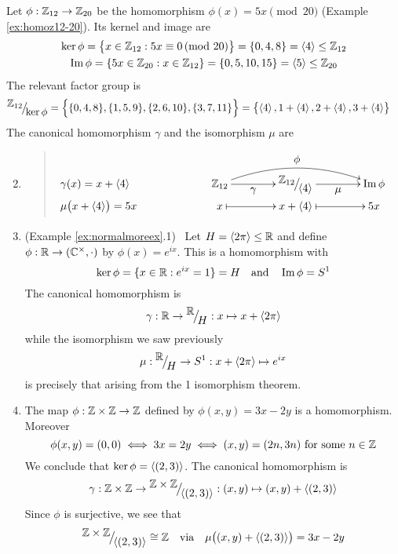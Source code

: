 \begin{examples}{}{}
\exstart Let $\phi:\mathbb{Z}_{12}\to\mathbb{Z}_{20}$ be the homomorphism $\phi(x)=5x\!\!\pmod{20}$ (Example \ref{ex:homoz12-20}). Its kernel and image are
	\begin{gather*}
	\ker\phi=\bigl\{x\in\mathbb{Z}_{12}:5x\equiv 0\negthickspace\pmod{20}\bigr\}=\{0,4,8\}=\left\langle 4\right\rangle\le \mathbb{Z}_{12}\\
	\operatorname{Im}\phi=\{5x\in\mathbb{Z}_{20}:x\in\mathbb{Z}_{12}\}=\{0,5,10,15\}=\left\langle 5\right\rangle\le\mathbb{Z}_{20}
	\end{gather*}
	The relevant factor group is
	\begin{align*}
	{}^{\textstyle {\mathbb{Z}_{12}}}\!\big/_{\textstyle \!{\ker\phi}}&=\Bigl\{\{0,4,8\},\{1,5,9\},\{2,6,10\},\{3,7,11\}\Bigr\}  =\bigl\{\left\langle 4\right\rangle,1+\left\langle 4\right\rangle,2+\left\langle 4\right\rangle,3+\left\langle 4\right\rangle\bigr\}
	\end{align*}
	The canonical homomorphism $\gamma$ and the isomorphism $\mu$ are\vspace{-5pt}
	\begin{enumerate}\setcounter{enumi}{1}
	  \item[]\begin{quote}
		$\SelectTips{cm}{}\xymatrix @C40pt @R0pt{
		\rlap{$\gamma(x)=x+\ip 4$} &&& \Z_{12} \ar@{->}[r]_-{\textstyle\gamma} \ar@{->}@/^15pt/[rr]^{\textstyle\phi} & \quotient{\Z_{12}}{\ip 4} \ar@{->}[r]_-{\textstyle\mu} & \image\phi\\
		\rlap{$\mu\bigl(x+\ip 4\bigr)=5x$} &&& x \ar@{|->}[r] & x+\ip 4 \ar@{|->}[r] & 5x
		}$
		\end{quote}
	  
	\item (Example \ref{ex:normalmoreex}.1) \ Let $H=\left\langle 2\pi\right\rangle\le\mathbb{R}$ and define $\phi:\mathbb{R}\to(\mathbb{C}^\times,\cdot)$ by $\phi(x)=e^{ix}$. This is a homomorphism with
  \[\ker\phi=\{x\in\mathbb{R}:e^{ix}=1\}=H\quad\text{and}\quad \operatorname{Im}\phi=S^1\]
  The canonical homomorphism is
  \[\gamma:\mathbb{R}\to{}^{\textstyle {\mathbb{R}}}\!\big/_{\textstyle \!{H}}:x\mapsto x+\left\langle 2\pi\right\rangle\]
  while the isomorphism we saw previously
  \[\mu:{}^{\textstyle {\mathbb{R}}}\!\big/_{\textstyle \!{H}}\to S^1:x+\left\langle 2\pi\right\rangle\mapsto e^{ix}\]
  is precisely that arising from the 1\st{} isomorphism theorem.
  
  \item The map $\phi:\mathbb{Z}\times\mathbb{Z}\to\mathbb{Z}$ defined by $\phi(x,y)=3x-2y$ is a homomorphism. Moreover
  \[\phi(x,y)=(0,0)\iff 3x=2y\iff (x,y)=(2n,3n)\text{ for some $n\in\mathbb{Z}$}\]
  We conclude that $\ker\phi=\left\langle (2,3)\right\rangle$. The canonical homomorphism is
  \[\gamma:\mathbb{Z}\times\mathbb{Z}\to{}^{\textstyle {\mathbb{Z}\times\mathbb{Z}}}\!\big/_{\textstyle \!{\left\langle (2,3)\right\rangle}}:(x,y)\mapsto (x,y)+\left\langle (2,3)\right\rangle\]
  Since $\phi$ is surjective, we see that
  \[{}^{\textstyle {\mathbb{Z}\times\mathbb{Z}}}\!\big/_{\textstyle \!{\left\langle (2,3)\right\rangle}}\cong\mathbb{Z}\quad\text{via}\quad \mu\bigl((x,y)+\left\langle (2,3)\right\rangle\bigr)=3x-2y\]
	\end{enumerate}
\end{examples}

